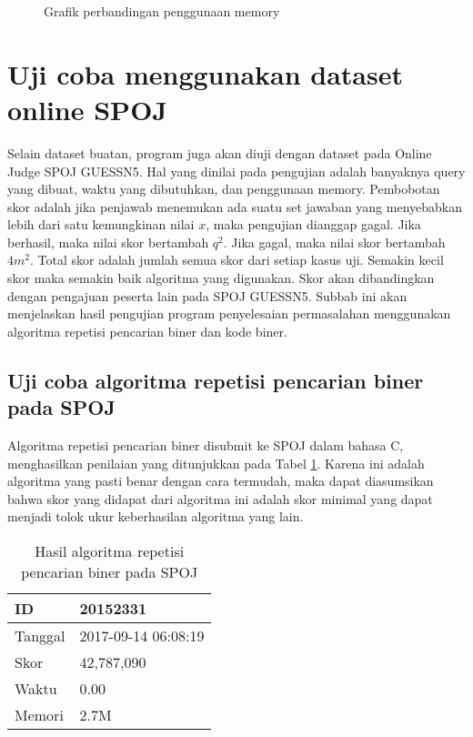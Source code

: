 \begin{figure}
\centering
{}
\caption{Grafik perbandingan penggunaan memory}
\label{fig:graph_memory}
\end{figure}

\section{Uji coba menggunakan dataset online SPOJ}

Selain dataset buatan, program juga akan diuji dengan dataset pada Online Judge SPOJ GUESSN5. Hal yang dinilai pada pengujian adalah banyaknya query yang dibuat, waktu yang dibutuhkan, dan penggunaan memory. Pembobotan skor adalah jika penjawab menemukan ada suatu set jawaban yang menyebabkan lebih dari satu kemungkinan nilai $x$, maka pengujian dianggap gagal. Jika berhasil, maka nilai skor bertambah $q^2$. Jika gagal, maka nilai skor bertambah $4m^2$. Total skor adalah jumlah semua skor dari setiap kasus uji. Semakin kecil skor maka semakin baik algoritma yang digunakan. Skor akan dibandingkan dengan pengajuan peserta lain pada SPOJ GUESSN5. Subbab ini akan menjelaskan hasil pengujian program penyelesaian permasalahan menggunakan algoritma repetisi pencarian biner dan kode biner.

\subsection{Uji coba algoritma repetisi pencarian biner pada SPOJ}

Algoritma repetisi pencarian biner disubmit ke SPOJ dalam bahasa C, menghasilkan penilaian yang ditunjukkan pada Tabel \ref{tab:score_repetitive}. Karena ini adalah algoritma yang pasti benar dengan cara termudah, maka dapat diasumsikan bahwa skor yang didapat dari algoritma ini adalah skor minimal yang dapat menjadi tolok ukur keberhasilan algoritma yang lain.

\begin{table}[h!]
\caption{Hasil algoritma repetisi pencarian biner pada SPOJ}
\label{tab:score_repetitive}
\begin{center}
\begin{tabular} {|l|l|}
\hline
ID & 20152331 \\ \hline
Tanggal & 2017-09-14 06:08:19 \\ \hline
Skor & 42,787,090 \\ \hline
Waktu & 0.00 \\ \hline
Memori & 2.7M \\ \hline
\end{tabular}
\end{center}
\end{table}

